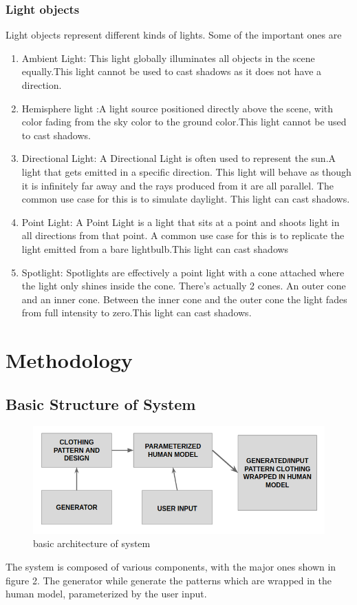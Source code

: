 \documentclass{article}
\begin{document}
    \subsubsection{Light objects}
    Light objects represent different kinds of lights. Some of the important ones are 
    \begin{enumerate}
        \item {Ambient Light}: This light globally illuminates all objects in the scene equally.This light cannot be used to cast shadows as it does not have a direction.
        \item {Hemisphere light} :A light source positioned directly above the scene, with color fading from the sky color to the ground color.This light cannot be used to cast shadows.
        \item {Directional Light}:  A Directional Light is often used to represent the sun.A light that gets emitted in a specific direction. This light will behave as though it is infinitely far away and the rays produced from it are all parallel. The common use case for this is to simulate daylight. This light can cast shadows.
        \item{Point Light}: A Point Light is a light that sits at a point and shoots light in all directions from that point.  A common use case for this is to replicate the light emitted from a bare lightbulb.This light can cast shadows 
        \item{Spotlight}: Spotlights are effectively a point light with a cone attached where the light only shines inside the cone. There's actually 2 cones. An outer cone and an inner cone. Between the inner cone and the outer cone the light fades from full intensity to zero.This light can cast shadows.
    \end{enumerate}


\section{Methodology}

    \subsection{Basic Structure of System}
        \begin{figure}[h]
            \centering
            \includegraphics[scale=0.75]{images/basicArchitecture.png}
            \caption{basic architecture of system}
        \end{figure}
    The system is composed of various components, with the major ones shown in figure 2. The generator while generate the patterns which are wrapped in the human model, parameterized by the user input.
    
\end{document}
